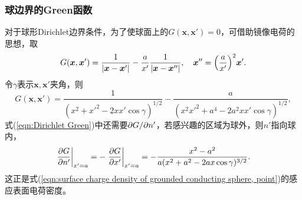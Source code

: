 \subsubsection{球边界的Green函数}
对于球形Dirichlet边界条件，为了使球面上的$G(\bm x,\bm x')=0$，可借助镜像电荷的思想，取
\begin{equation}
    \label{eqn:sphere Green function}
    G(\bm x,\bm x')=\frac1{|\bm x-\bm x'|}-\frac a{x'}\frac1{|\bm x-\bm x''|},\quad\bm x''=\Bigl(\frac{a}{x'}\Bigr)^2\bm x'.
\end{equation}
令$\gamma$表示$\bm x,\bm x'$夹角，则
\[
    G(\bm x,\bm x')=\frac1{(x^2+x'^2-2xx'\cos\gamma)^{1/2}}-\frac a{(x^2x'^2+a^4-2a^2xx'\cos\gamma)^{1/2}},
\]
式(\ref{eqn:Dirichlet Green})中还需要$\partial G/\partial n'$，若感兴趣的区域为球外，则$n'$指向球内，
\begin{equation}
    \label{eqn:sphere dGreen function}
    \edg{\pv G{n'}}_{x'=a}=-\edg{\pv G{x'}}_{x'=a}=-\frac{x^2-a^2}{a(x^2+a^2-2ax\cos\gamma)^{3/2}}.
\end{equation}
这正是式(\ref{eqn:surface charge density of grounded conducting sphere, point})的感应表面电荷密度。

